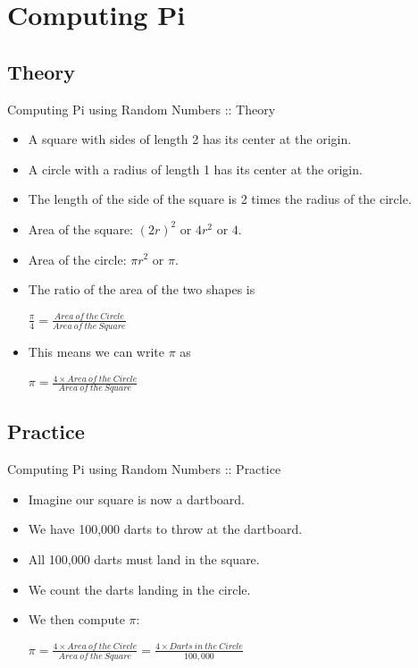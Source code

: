 \documentclass{beamer}
\begin{document}
\section{Computing Pi}

\subsection{Theory}

\begin{frame}{Computing Pi using Random Numbers :: Theory}

\begin{itemize}
    \item A square with sides of length 2 has its center at the origin.
    \item A circle with a radius of length 1 has its center at the origin.
    \item The length of the side of the square is 2 times the radius of the circle. 
\item Area of the square: $(2r)^2$ or $4r^2$ or $4$.
\item Area of the circle: $\pi r^2$ or $\pi$.

\item The ratio of the area of the two shapes is

\begin{math}
\frac{\pi}{4} = \frac{Area\:of\:the\:Circle}{Area\:of\:the\:Square}
\end{math}

\item This means we can write $\pi$ as

\begin{math}
\pi = \frac{4 \times Area\:of\:the\:Circle}{Area\:of\:the\:Square}
\end{math}

\end{itemize}
\end{frame}

\subsection{Practice}

\begin{frame}{Computing Pi using Random Numbers :: Practice}

\begin{itemize}
\item Imagine our square is now a dartboard.
\item We have 100,000 darts to throw at the dartboard.
\item All 100,000 darts must land in the square.
\item We count the darts landing in the circle.
\item We then compute $\pi$:

\begin{math}
\pi = \frac{4 \times Area\:of\:the\:Circle}{Area\:of\:the\:Square} = \frac{4 \times Darts\:in\:the\:Circle}{100,000}
\end{math}

\end{itemize}
\end{frame}
\end{document}
